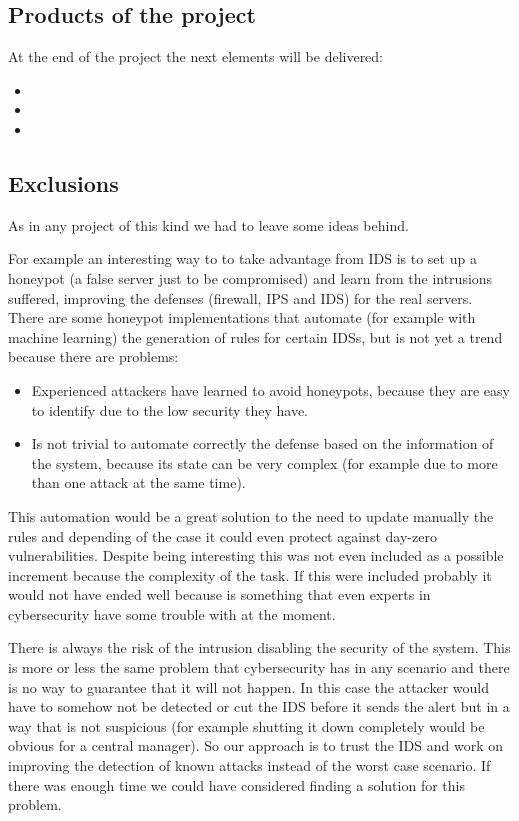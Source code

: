 \subsection{Products of the project}
At the end of the project the next elements will be delivered:
\begin{itemize}
	\item 
	\item 
	\item 
\end{itemize}



\subsection{Exclusions} 	%
As in any project of this kind we had to leave some ideas behind.

\linej
\linej
For example an interesting way to to take advantage from IDS is to set up a honeypot (a false server just to be compromised) and learn from the intrusions suffered, improving the defenses (firewall, IPS and IDS) for the real servers. There are some honeypot implementations that automate (for example with machine learning) the generation of rules for certain IDSs, but is not yet a trend because there are problems\cite{snort_learning}\cite{honeypot_weka_learning}\cite{honeypot_ossec_trees}\cite{snort_honeypot}:
\begin{itemize}
	\item Experienced attackers have learned to avoid honeypots, because they are easy to identify due to the low security they have.
	\item Is not trivial to automate correctly the defense based on the information of the system, because its state can be very complex (for example due to more than one attack at the same time).
\end{itemize}
\linej
This automation would be a great solution to the need to update manually the rules and depending of the case it could even protect against day-zero vulnerabilities. Despite being interesting this was not even included as a possible increment because the complexity of the task. If this were included probably it would not have ended well because is something that even experts in cybersecurity have some trouble with at the moment.

\linej
\linej
There is always the risk of the intrusion disabling the security of the system. This is more or less the same problem that cybersecurity has in any scenario and there is no way to guarantee that it will not happen. In this case the attacker would have to somehow not be detected or cut the IDS before it sends the alert but in a way that is not suspicious (for example shutting it down completely would be obvious for a central manager). So our approach is to trust the IDS and work on improving the detection of known attacks instead of the worst case scenario. If there was enough time we could have considered finding a solution for this problem.

